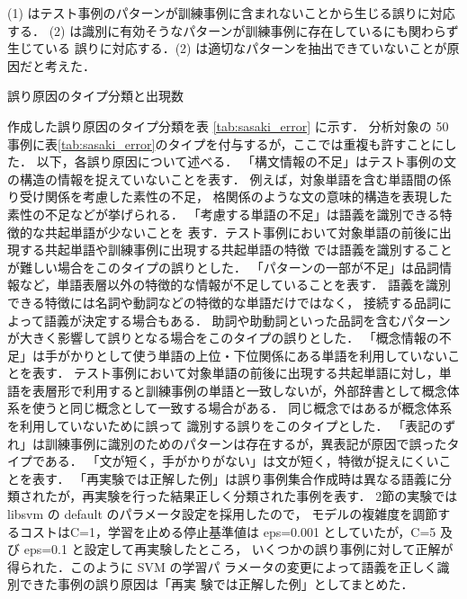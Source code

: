 \documentclass[japanese]{jnlp_1.4}
\begin{document}
(1) はテスト事例のパターンが訓練事例に含まれないことから生じる誤りに対応する．
(2) は識別に有効そうなパターンが訓練事例に存在しているにも関わらず生じている
誤りに対応する．(2) は適切なパターンを抽出できていないことが原因だと考えた．

\begin{table}[b]
\caption{誤り原因のタイプ分類と出現数}
\label{tab:sasaki_error}

\end{table}

作成した誤り原因のタイプ分類を表 \ref{tab:sasaki_error} に示す．
分析対象の 50事例に表\ref{tab:sasaki_error}のタイプを付与するが，ここでは重複も許すことにした．
以下，各誤り原因について述べる．
「構文情報の不足」はテスト事例の文の構造の情報を捉えていないことを表す．
例えば，対象単語を含む単語間の係り受け関係を考慮した素性の不足，
格関係のような文の意味的構造を表現した素性の不足などが挙げられる．
「考慮する単語の不足」は語義を識別できる特徴的な共起単語が少ないことを
表す．テスト事例において対象単語の前後に出現する共起単語や訓練事例に出現する共起単語の特徴
では語義を識別することが難しい場合をこのタイプの誤りとした．
「パターンの一部が不足」は品詞情報など，単語表層以外の特徴的な情報が不足していることを表す．
語義を識別できる特徴には名詞や動詞などの特徴的な単語だけではなく，
接続する品詞によって語義が決定する場合もある．
助詞や助動詞といった品詞を含むパターンが大きく影響して誤りとなる場合をこのタイプの誤りとした．
「概念情報の不足」は手がかりとして使う単語の上位・下位関係にある単語を利用していないことを表す．
テスト事例において対象単語の前後に出現する共起単語に対し，単語を表層形で利用すると訓練事例の単語と一致しないが，外部辞書として概念体系を使うと同じ概念として一致する場合がある．
同じ概念ではあるが概念体系を利用していないために誤って
識別する誤りをこのタイプとした．
「表記のずれ」は訓練事例に識別のためのパターンは存在するが，異表記が原因で誤ったタイプである．
「文が短く，手がかりがない」は文が短く，特徴が捉えにくいことを表す．
「再実験では正解した例」は誤り事例集合作成時は異なる語義に分類されたが，再実験を行った結果正しく分類された事例を表す．
2節の実験では libsvm の default のパラメータ設定を採用したので，
モデルの複雑度を調節するコストはC=1，学習を止める停止基準値は
eps=0.001 としていたが，C=5 及び eps=0.1 と設定して再実験したところ，
いくつかの誤り事例に対して正解が得られた．このように SVM の学習パ
ラメータの変更によって語義を正しく識別できた事例の誤り原因は「再実
験では正解した例」としてまとめた．
\end{document}
